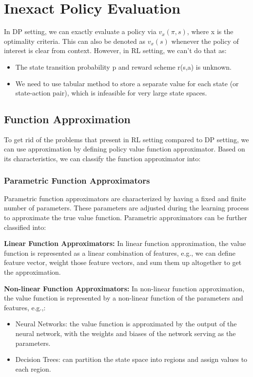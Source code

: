 \section{Inexact Policy Evaluation}

In DP setting, we can exactly evaluate a policy via \(v_x(\pi, s)\), where x is the optimality criteria. This can also be denoted as $v_x(s)$ whenever the policy of interest is clear from context. However, in RL setting, we can't do that as:
\begin{itemize}
    \item The state transition probability p and reward scheme r(s,a) is unknown.
    \item We need to use tabular method to store a separate value for each state (or state-action pair), which is infeasible for very large state spaces.
\end{itemize}

\subsection{Function Approximation}
To get rid of the problems that present in RL setting compared to DP setting, we can use approximation by defining policy value function approximator. Based on its characteristics, we can classify the function approximator into:

\subsubsection{Parametric Function Approximators}
Parametric function approximators are characterized by having a fixed and finite number of parameters. These parameters are adjusted during the learning process to approximate the true value function. Parametric approximators can be further classified into:

\textbf{Linear Function Approximators:}
In linear function approximation, the value function is represented as a linear combination of features, e.g., we can define feature vector, weight those feature vectors, and sum them up altogether to get the approximation. 

\textbf{Non-linear Function Approximators:}
In non-linear function approximation, the value function is represented by a non-linear function of the parameters and features, e.g.,:
\begin{itemize}
    \item Neural Networks: the value function is approximated by the output of the neural network, with the weights and biases of the network serving as the parameters.
    \item Decision Trees: can partition the state space into regions and assign values to each region.
\end{itemize}

